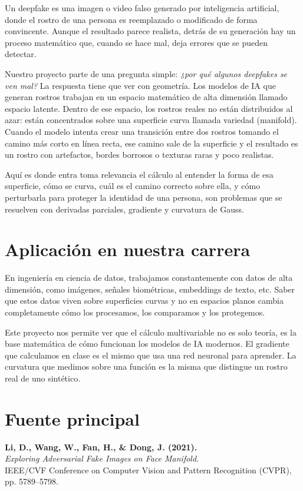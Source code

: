 \documentclass[10pt,twocolumn,letterpaper]{article}
\begin{document}
	Un deepfake es una imagen o video falso generado por inteligencia artificial, donde el rostro de una persona es reemplazado o modificado de forma convincente. Aunque el resultado parece realista, detrás de su generación hay un proceso matemático que, cuando se hace mal, deja errores que se pueden detectar.
	
	Nuestro proyecto parte de una pregunta simple: \textit{¿por qué algunos deepfakes se ven mal?} La respuesta tiene que ver con geometría. Los modelos de IA que generan rostros trabajan en un espacio matemático de alta dimensión llamado espacio latente. Dentro de ese espacio, los rostros reales no están distribuidos al azar: están concentrados sobre una superficie curva llamada variedad (manifold). Cuando el modelo intenta crear una transición entre dos rostros tomando el camino más corto en línea recta, ese camino sale de la superficie y el resultado es un rostro con artefactos, bordes borrosos o texturas raras y poco realistas.
	
	Aquí es donde entra toma relevancia el cálculo al entender la forma de esa superficie, cómo se curva, cuál es el camino correcto sobre ella, y cómo perturbarla para proteger la identidad de una persona, son problemas que se resuelven con derivadas parciales, gradiente y curvatura de Gauss.
	
	\section{Aplicación en nuestra carrera}
	
	En ingeniería en ciencia de datos, trabajamos constantemente con datos de alta dimensión, como imágenes, señales biométricas, embeddings de texto, etc. Saber que estos datos viven sobre superficies curvas y no en espacios planos cambia completamente cómo los procesamos, los comparamos y los protegemos.
	
	Este proyecto nos permite ver que el cálculo multivariable no es solo teoría, es la base matemática de cómo funcionan los modelos de IA modernos. El gradiente que calculamos en clase es el mismo que usa una red neuronal para aprender. La curvatura que medimos sobre una función es la misma que distingue un rostro real de uno sintético.
	
	\section{Fuente principal}
	
	\textbf{Li, D., Wang, W., Fan, H., \& Dong, J. (2021).}\\
	\textit{Exploring Adversarial Fake Images on Face Manifold.}\\
	IEEE/CVF Conference on Computer Vision and Pattern Recognition (CVPR), pp. 5789--5798.
	
\end{document}
